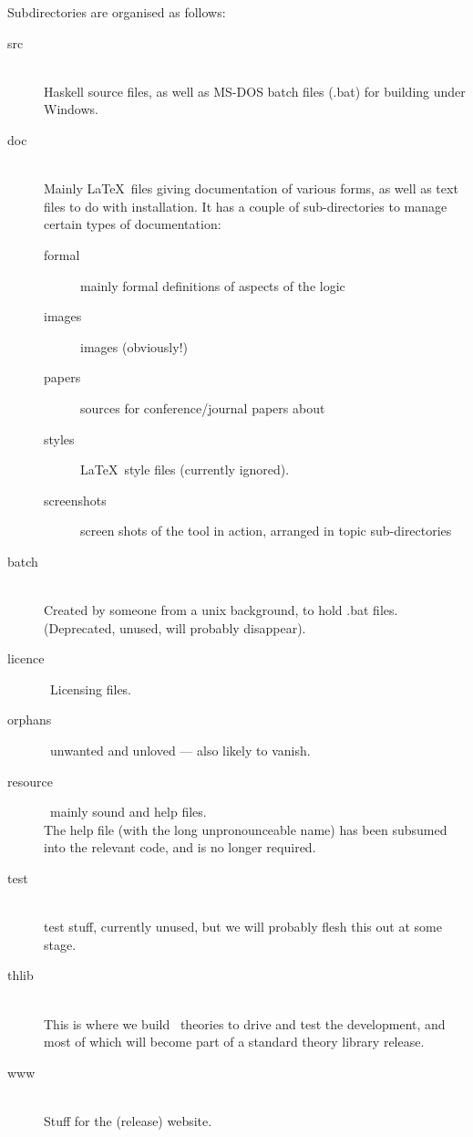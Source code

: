 \newpage
Subdirectories are organised as follows:
\begin{description}
  \item[src]~\\
     Haskell source files, as well as MS-DOS batch files (.bat)
     for building under Windows.
  \item[doc]~\\
     Mainly \LaTeX\ files giving documentation of various forms,
     as well as text files to do with installation.
     It has a couple of sub-directories to manage certain types of documentation:
     \begin{description}
       \item[formal] mainly formal definitions of aspects of the logic
       \item[images] images (obviously!)
       \item[papers] sources for conference/journal papers about 
       \item[styles] \LaTeX\ style files (currently ignored).
       \item[screenshots] screen shots of the tool in action,
           arranged in topic sub-directories
     \end{description}
  \item[batch]~\\
     Created by someone from a unix background, to hold .bat files.
     \\(Deprecated, unused, will probably disappear).
  \item[licence]~Licensing files.
  \item[orphans]~unwanted and unloved --- also likely to vanish.
  \item[resource]~mainly sound and help files.
    \\The help file (with the long unpronounceable name)
     has been subsumed into the relevant code,
     and is no longer required.
  \item[test]~\\
     test stuff, currently unused,
     but we will probably flesh this out at some stage.
  \item[thlib]~\\
     This is where we build \ theories to drive and test the development,
     and most of which will become part of a standard theory library release.
  \item[www]~\\
     Stuff for the (release) website.
\end{description}
